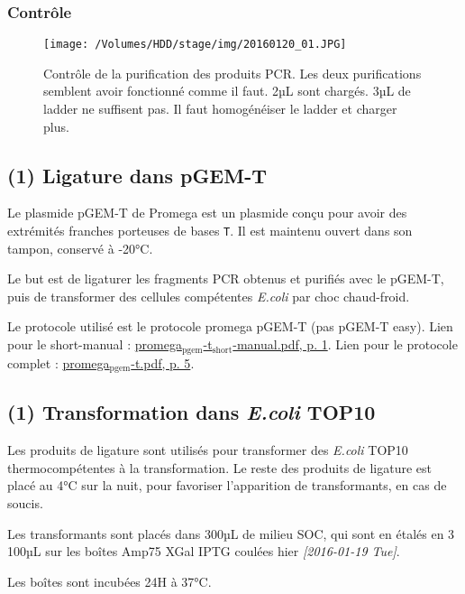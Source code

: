 \documentclass[9pt, oneside, twocolumn]{scrartcl}
\begin{document}
\subsubsection{Contrôle}
\label{sec:orgheadline63}

\begin{figure}[htb]
\centering
\texttt{[image: /Volumes/HDD/stage/img/20160120\_01.JPG]}
\caption{Contrôle de la purification des produits PCR. Les deux purifications semblent avoir fonctionné comme il faut. 2µL sont chargés. 3µL de ladder ne suffisent pas. Il faut homogénéiser le ladder et charger plus.}
\end{figure}
\subsection{(1) Ligature dans pGEM-T}
\label{sec:orgheadline65}
Le plasmide pGEM-T de Promega est un plasmide conçu pour avoir des extrémités
franches porteuses de bases \texttt{T}. Il est maintenu ouvert dans son tampon,
conservé à -20°C. 

Le but est de ligaturer les fragments PCR obtenus et purifiés avec le pGEM-T,
puis de transformer des cellules compétentes \emph{E.coli} par choc chaud-froid. 

Le protocole utilisé est le protocole promega pGEM-T (pas pGEM-T easy). Lien
pour le short-manual : \href{///Users/samuelbarreto/Dropbox/Cours/Master/Semestre4/StageM2/doc/promega_pgem-t_short-manual.pdf::1}{promega\(_{\text{pgem}}\)-t\(_{\text{short}}\)-manual.pdf, p. 1}. Lien pour le
protocole complet : \href{///Users/samuelbarreto/Dropbox/Cours/Master/Semestre4/StageM2/doc/promega_pgem-t.pdf::5}{promega\(_{\text{pgem}}\)-t.pdf, p. 5}.

\subsection{(1) Transformation dans \emph{E.coli} TOP10}
\label{sec:orgheadline66}
Les produits de ligature sont utilisés pour transformer des \emph{E.coli} TOP10
thermocompétentes à la transformation. Le reste des produits de ligature est
placé au 4°C sur la nuit, pour favoriser l'apparition de transformants, en cas
de soucis.

Les transformants sont placés dans 300µL de milieu SOC, qui sont en étalés en 3
\texttimes{} 100µL sur les boîtes Amp75 XGal IPTG coulées hier \textit{[2016-01-19 Tue]}.

Les boîtes sont incubées 24H à 37°C. 
\end{document}
